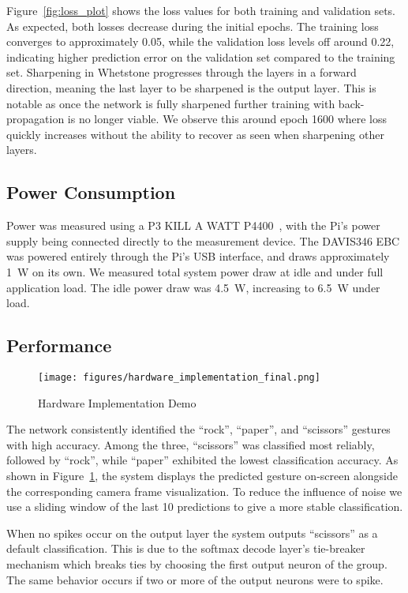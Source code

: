 \documentclass[conference]{IEEEtran}
\begin{document}
Figure~\ref{fig:loss_plot} shows the loss values for both training and validation sets. As expected, both losses decrease during the initial epochs. The training loss converges to approximately 0.05, while the validation loss levels off around 0.22, indicating higher prediction error on the validation set compared to the training set. Sharpening in Whetstone progresses through the layers in a forward direction, meaning the last layer to be sharpened is the output layer. This is notable as once the network is fully sharpened further training with back-propagation is no longer viable. We observe this around epoch 1600 where loss quickly increases without the ability to recover as seen when sharpening other layers.

\subsection{Power Consumption}
Power was measured using a P3 KILL A WATT P4400~\cite{killawatt}, with the Pi's power supply being connected directly to the measurement device. The DAVIS346 EBC was powered entirely through the Pi's USB interface, and draws approximately 1~W on its own. We measured total system power draw at idle and under full application load. The idle power draw was 4.5~W, increasing to 6.5~W under load.

\subsection{Performance}
\begin{figure}[!ht]
    \texttt{[image: figures/hardware\_implementation\_final.png]}
    \caption{Hardware Implementation Demo}
    \label{fig:hardware_implementation}
\end{figure}
The network consistently identified the ``rock'', ``paper'', and ``scissors'' gestures with high accuracy. Among the three, ``scissors'' was classified most reliably, followed by ``rock'', while ``paper'' exhibited the lowest classification accuracy. As shown in Figure~\ref{fig:hardware_implementation}, the system displays the predicted gesture on-screen alongside the corresponding camera frame visualization. To reduce the influence of noise we use a sliding window of the last 10 predictions to give a more stable classification.

When no spikes occur on the output layer the system outputs ``scissors'' as a default classification. This is due to the softmax decode layer's tie-breaker mechanism which breaks ties by choosing the first output neuron of the group. The same behavior occurs if two or more of the output neurons were to spike.
\end{document}
